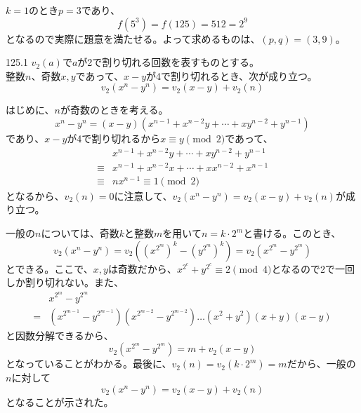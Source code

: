 $k=1$のとき$p=3$であり、
\[ f(5^3)=f(125)=512=2^9 \]
となるので実際に題意を満たせる。よって求めるものは、$(p, q)=(3, 9)$。

\begin{subthm}{125.1}
 $v_2(a)$で$a$が2で割り切れる回数を表すものとする。\\
 整数$n$、奇数$x, y$であって、$x-y$が4で割り切れるとき、次が成り立つ。
 \[ v_2(x^n-y^n)=v_2(x-y)+v_2(n) \]
\end{subthm}
はじめに、$n$が奇数のときを考える。
\[ x^n-y^n=(x-y)(x^{n-1}+x^{n-2}y+\cdots+xy^{n-2}+y^{n-1}) \]
であり、$x-y$が4で割り切れるから$x\equiv y\pmod{2}$であって、
\begin{align*}
 &x^{n-1}+x^{n-2}y+\cdots+xy^{n-2}+y^{n-1} \\
 \equiv &x^{n-1}+x^{n-2}x+\cdots+xx^{n-2}+x^{n-1} \\
 \equiv & nx^{n-1} \equiv 1 \pmod{2}
\end{align*}
となるから、$v_2(n)=0$に注意して、$v_2(x^n-y^n)=v_2(x-y)+v_2(n)$が成り立つ。

一般の$n$については、奇数$k$と整数$m$を用いて$n=k\cdot 2^m$と書ける。このとき、
\[ v_2(x^n-y^n)=v_2\left((x^{2^m})^k-(y^{2^m})^k\right)=v_2(x^{2^m}-y^{2^m}) \]
とできる。ここで、$x, y$は奇数だから、$x^{2^c}+y^{2^c}\equiv 2 \pmod{4}$となるので2で一回しか割り切れない。また、
\begin{align*}
 &x^{2^m}-y^{2^m} \\
 =&(x^{2^{m-1}}-y^{2^{m-1}})(x^{2^{m-2}}-y^{2^{m-2}})\dots(x^2+y^2)(x+y)(x-y)
\end{align*}
と因数分解できるから、
\[ v_2(x^{2^m}-y^{2^m})=m+v_2(x-y) \]
となっていることがわかる。最後に、$v_2(n)=v_2(k\cdot 2^m)=m$だから、一般の$n$に対して
\[ v_2(x^n-y^n)=v_2(x-y)+v_2(n) \]
となることが示された。